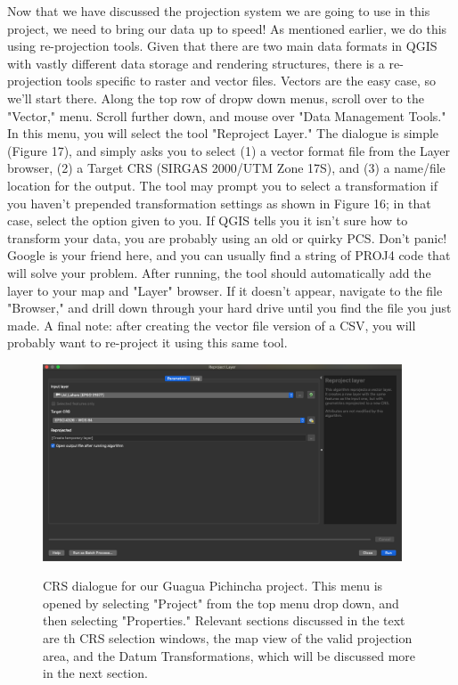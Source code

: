 \documentclass{article}
\begin{document}
Now that we have discussed the projection system we are going to use in this project, we need to bring our data up to speed! As mentioned earlier, we do this using re-projection tools. Given that there are two main data formats in QGIS with vastly different data storage and rendering structures, there is a re-projection tools specific to raster and vector files. Vectors are the easy case, so we'll start there. Along the top row of dropw down menus, scroll over to the "Vector," menu. Scroll further down, and mouse over "Data Management Tools." In this menu, you will select the tool "Reproject Layer." The dialogue is simple (Figure 17), and simply asks you to select (1) a vector format file from the Layer browser, (2) a Target CRS (SIRGAS 2000/UTM Zone 17S), and (3) a name/file location for the output. The tool may prompt you to select a transformation if you haven't prepended transformation settings as shown in Figure 16; in that case, select the option given to you. If QGIS tells you it isn't sure how to transform your data, you are probably using an old or quirky PCS. Don't panic! Google is your friend here, and you can usually find a string of PROJ4 code that will solve your problem. After running, the tool should automatically add the layer to your map and "Layer" browser. If it doesn't appear, navigate to the file "Browser," and drill down through your hard drive until you find the file you just made. A final note: after creating the vector file version of a CSV, you will probably want to re-project it using this same tool. 

\begin{figure}[htbp]
    \centering
    \includegraphics[width=0.95\textwidth]{Fig_18_reproj_vector.png}
    \label{fig13}
    \caption{CRS dialogue for our Guagua Pichincha project. This menu is opened by selecting "Project" from the top menu drop down, and then selecting "Properties." Relevant sections discussed in the text are th CRS selection windows, the map view of the valid projection area, and the Datum Transformations, which will be discussed more in the next section.}
\end{figure}
\end{document}
